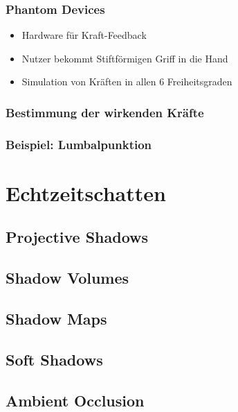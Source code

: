 \documentclass[a4paper, 12pt]{article}
\begin{document}
\subsubsection*{Phantom Devices}
\begin{itemize}
  \item Hardware für Kraft-Feedback
  \item Nutzer bekommt Stiftförmigen Griff in die Hand
  \item Simulation von Kräften in allen 6 Freiheitsgraden
\end{itemize}

\subsubsection*{Bestimmung der wirkenden Kräfte}


\subsubsection*{Beispiel: Lumbalpunktion}



\section{Echtzeitschatten}


\subsection{Projective Shadows}


\subsection{Shadow Volumes}


\subsection{Shadow Maps}


\subsection{Soft Shadows}


\subsection{Ambient Occlusion}
\end{document}
